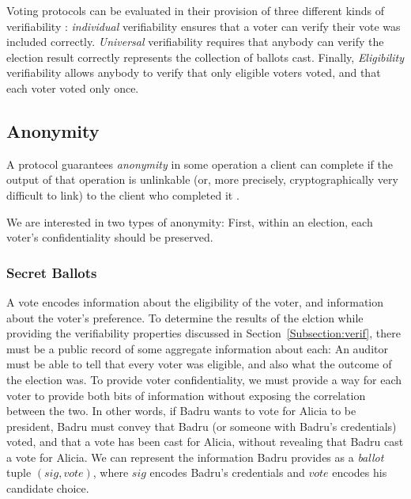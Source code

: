   Voting protocols can be evaluated in their provision of three different
  kinds of verifiability \cite{kremer_election_2010}: \emph{individual}
  verifiability ensures that a voter can verify their vote was included
  correctly. \emph{Universal} verifiability requires that anybody can verify
  the election result correctly represents the collection of ballots cast.
  Finally, \emph{Eligibility} verifiability allows anybody to verify that
  only eligible voters voted, and that each voter voted only once.


  \subsection{Anonymity}\label{Subsection:anon}
  A protocol guarantees \emph{anonymity} in some operation a client can
  complete if the output of that operation is unlinkable (or, more precisely,
  cryptographically very difficult to link) to the client who completed it
  \cite{p2pd}. 

  We are interested in two types of anonymity: First, within an election,
  each voter's confidentiality should be preserved.

  \subsubsection{Secret Ballots}
  A vote encodes information about the eligibility of the voter, and
  information about the voter's preference. To determine the results of the
  elction while providing the verifiability properties discussed in
  Section~\ref{Subsection:verif}, there must be a public record of some
  aggregate information about each: An auditor must be able to tell that every
  voter was eligible, and also what the outcome of the election was. To provide
  voter confidentiality, we must provide a way for each voter to provide both
  bits of information without exposing the correlation between the two. In
  other words, if Badru wants to vote for Alicia to be president, Badru must
  convey that Badru (or someone with Badru's credentials) voted, and that a
  vote has been cast for Alicia, without revealing that Badru cast a vote for
  Alicia. We can represent the information Badru provides as a
  \emph{ballot} tuple $(sig, vote)$, where $sig$ encodes Badru's credentials and
  $vote$ encodes his candidate choice.

